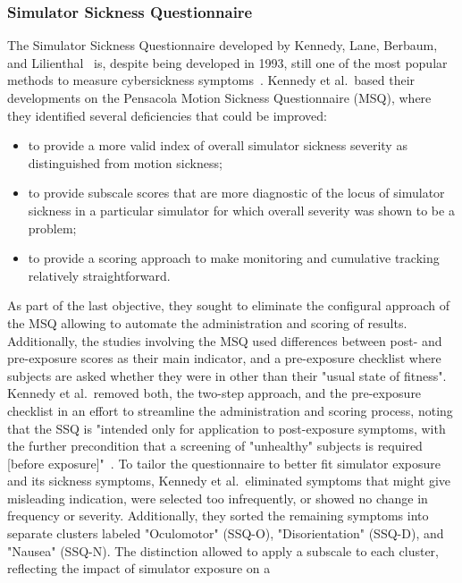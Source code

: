 \subsubsection{Simulator Sickness Questionnaire}\label{subsubsec:simulator-sickness-questionnaire}

The Simulator Sickness Questionnaire developed by Kennedy, Lane, Berbaum, and Lilienthal~\cite{Kennedy1993} is,
despite being developed in 1993, still one of the most popular methods to measure cybersickness
symptoms~\cite{Saredakis2020}.
Kennedy et al.\ based their developments on the Pensacola Motion Sickness Questionnaire (MSQ), where they identified
several deficiencies that could be improved:
\begin{itemize}
    \item to provide a more valid index of overall simulator sickness severity as distinguished from motion sickness;
    \item to provide subscale scores that are more diagnostic of the locus of simulator sickness in a particular
    simulator for which overall severity was shown to be a problem;
    \item to provide a scoring approach to make monitoring and cumulative tracking relatively straightforward.
\end{itemize}
As part of the last objective, they sought to eliminate the configural approach of the MSQ allowing to automate the
administration and scoring of results.
Additionally, the studies involving the MSQ used differences between post- and pre-exposure scores as their main
indicator, and a pre-exposure checklist where subjects are asked whether they were in other than their "usual state 
of fitness".
Kennedy et al.\ removed both, the two-step approach, and the pre-exposure checklist in an effort to streamline the
administration and scoring process, noting that the SSQ is "intended only for application to post-exposure symptoms,
with the further precondition that a screening of "unhealthy" subjects is required [before exposure]"~\cite[p.
207]{Kennedy1993}.
To tailor the questionnaire to better fit simulator exposure and its sickness symptoms, Kennedy et al.\ eliminated
symptoms that might give misleading indication, were selected too infrequently, or showed no change in frequency or
severity.
Additionally, they sorted the remaining symptoms into separate clusters labeled "Oculomotor" (SSQ-O),
"Disorientation" (SSQ-D), and "Nausea" (SSQ-N).
The distinction allowed to apply a subscale to each cluster, reflecting the impact of simulator exposure on a
